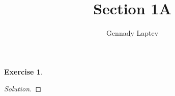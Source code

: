 \documentclass[letterpaper, 11pt, english]{article}
\title{Section 1A}
\author{Gennady Laptev}
\theoremstyle{definition}
\theoremstyle{definition}
\newtheorem{problem}{Exercise}
\theoremstyle{definition}
\newenvironment{sol}{\begin{proof}[Solution]}{\end{proof}}
\theoremstyle{plain} %
\theoremstyle{plain} %
\theoremstyle{plain} %
\theoremstyle{plain} %
\theoremstyle{remark}
\begin{document}
\maketitle
\setcounter{section}{0}

\setcounter{problem}{0}
\begin{problem}
\begin{sol}
    
\end{sol}
\end{problem}


 
\end{document}
